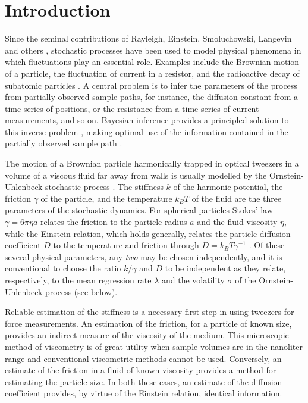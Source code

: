 \documentclass[english,aps, twocolumn, pre,superscriptaddress]{revtex4-1}
\begin{document}
\section{Introduction}

Since the seminal contributions of Rayleigh, Einstein, Smoluchowski,
Langevin and others \cite{chandrasekhar1943stochastic}, stochastic
processes have been used to model physical phenomena in which fluctuations
play an essential role. Examples include the Brownian motion of a
particle, the fluctuation of current in a resistor, and the radioactive
decay of subatomic particles \cite{van1992stochastic}. A central
problem is to infer the parameters of the process from partially observed
sample paths, for instance, the diffusion constant from a time series
of positions, or the resistance from a time series of current measurements,
and so on. Bayesian inference provides a principled solution to this
inverse problem \cite{jeffreys1998theory}, making optimal use of
the information contained in the partially observed sample path \cite{zellner1988optimal}. 

The motion of a Brownian particle harmonically trapped in optical
tweezers in a volume of a viscous fluid far away from walls is usually
modelled by the Ornstein-Uhlenbeck stochastic process \cite{van1992stochastic,gardiner1985handbook}.
The stiffness $k$ of the harmonic potential, the friction $\gamma$
of the particle, and the temperature $k_{B}T$ of the fluid are the
three parameters of the stochastic dynamics. For spherical particles
Stokes' law $\gamma=6\pi\eta a$ relates the friction to the particle
radius $a$ and the fluid viscosity $\eta$, while the Einstein relation,
which holds generally, relates the particle diffusion coefficient
$D$ to the temperature and friction through $D=k_{B}T\gamma^{-1}$
\cite{kubo1966fluctuation}. Of these several physical parameters,
any \emph{two} may be chosen independently, and it is conventional
to choose the ratio $k/\gamma$ and $D$ to be independent as they
relate, respectively, to the mean regression rate $\lambda$ and the
volatility $\sigma$ of the Ornstein-Uhlenbeck process (see below). 

Reliable estimation of the stiffness is a necessary first step in
using tweezers for force measurements. An estimation of the friction,
for a particle of known size, provides an indirect measure of the
viscosity of the medium. This microscopic method of viscometry is
of great utility when sample volumes are in the nanoliter range and
conventional viscometric methods cannot be used. Conversely, an estimate
of the friction in a fluid of known viscosity provides a method for
estimating the particle size. In both these cases, an estimate of
the diffusion coefficient provides, by virtue of the Einstein relation,
identical information.
\end{document}
